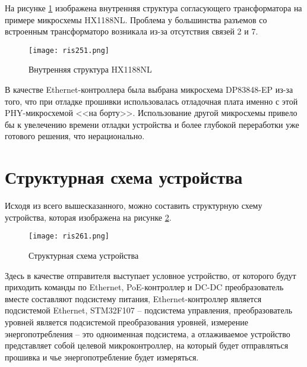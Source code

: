 На рисунке \ref{ris:251} изображена внутренняя структура согласующего трансформатора на примере микросхемы
HX1188NL. Проблема у большинства разъемов со встроенным трансформаторо возникала из-за
отсутствия связей 2 и 7. 

\begin{figure}[H]
  \centering
  \texttt{[image: ris251.png]}
  \caption{Внутренняя структура HX1188NL}
  \label{ris:251}
\end{figure}

В качестве Ethernet-контроллера была выбрана микросхема DP83848-EP из-за того, что при отладке
прошивки использовалась отладочная плата именно с этой PHY-микросхемой <<на борту>>. Использование
другой микросхемы привело бы к увелечению времени отладки устройства и более глубокой переработки
уже готового решения, что нерационально.

\section{Структурная схема устройства}
\hspace{1cm}

Исходя из всего вышесказанного, можно составить структурную схему устройства, которая изображена
на рисунке \ref{ris:261}.

\begin{figure}[H]
  \centering
  \texttt{[image: ris261.png]}
  \caption{Структурная схема устройства}
  \label{ris:261}
\end{figure}

Здесь в качестве отправителя выступает условное устройство, от которого будут приходить
команды по Ethernet, PoE-контроллер и DC-DC преобразователь вместе составляют подсистему питания,
Ethernet-контроллер является подсистемой Ethernet, STM32F107 -- подсистема управления, 
преобразователь уровней является подсистемой преобразования уровней, измерение энергопотребления --
это одноименная подсистема, а отлаживаемое устройство представляет собой целевой микроконтроллер,
на который будет отправляться прошивка и чье энергопотребление будет измеряться.


